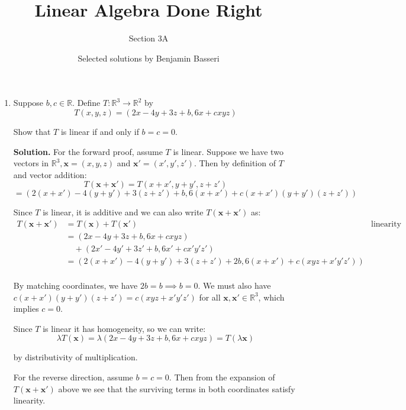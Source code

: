 \documentclass{scrartcl}
\newcommand{\R}{\mathbb{R}}
\begin{document}
\title{Linear Algebra Done Right}
\subtitle{Section 3A}
\author{Selected solutions by Benjamin Basseri}
\date{}
\maketitle

\begin{enumerate}
	\item Suppose $b, c \in \R$. Define $T: \R^3 \rightarrow \R^2$ by 
$$T(x, y, z) = (2x-4y+3z+b, 6x + cxyz)$$

Show that $T$ is linear if and only if $b = c = 0$.

\textbf{Solution.} For the forward proof, assume $T$ is linear. Suppose we have two vectors in $\R^3, \mathbf{x} = (x, y, z)$ and $\mathbf{x}' = (x', y', z')$. Then by definition of $T$ and vector addition:
$$T(\mathbf{x} + \mathbf{x}') = T(x + x', y+y', z+z')$$
$$ = (2(x+x') - 4(y+y') + 3(z+z') + b, 6(x+x')+c(x+x')(y+y')(z+z'))$$

Since $T$ is linear, it is additive and we can also write $T(\mathbf{x} + \mathbf{x}')$ as:
\begin{align*}
	T(\mathbf{x} + \mathbf{x}') &= T(\mathbf{x}) + T(\mathbf{x}') &\text{linearity}\\
	&=(2x - 4y + 3z + b, 6x + cxyz)&\\
	& \quad  + (2x' - 4y' + 3z' + b, 6x' +cx'y'z')&\\
	&= \left(2(x+x') - 4(y+y') + 3(z+z') + 2b, 6(x+x') + c(xyz + x'y'z')\right)&\\
\end{align*}

By matching coordinates, we have $2b = b \implies b = 0$. We must also have $c(x+x')(y+y')(z+z') = c(xyz + x'y'z')$ for all $\mathbf{x}, \mathbf{x}' \in \R^3$, which implies $c=0$.

Since $T$ is linear it has homogeneity, so we can write:
$$\lambda T(\mathbf{x}) = \lambda (2x-4y+3z+b, 6x + cxyz) = T(\lambda \mathbf{x})$$

by distributivity of multiplication. 


For the reverse direction, assume $b = c = 0$. Then from the expansion of $T(\mathbf{x} + \mathbf{x}')$ above we see that the surviving terms in both coordinates satisfy linearity.

\end{enumerate}
\end{document}
